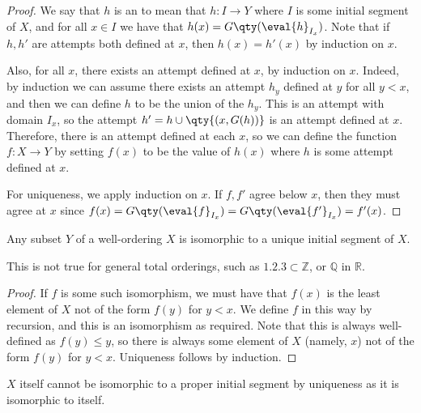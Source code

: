 \begin{proof}
    We say that $h$ is an  to mean that $h \colon I \to Y$ where $I$ is some initial segment of $X$, and for all $x \in I$ we have that $h(x) = G\qty(\eval{h}_{I_x})$.
    Note that if $h, h'$ are attempts both defined at $x$, then $h(x) = h'(x)$ by induction on $x$.

    Also, for all $x$, there exists an attempt defined at $x$, by induction on $x$.
    Indeed, by induction we can assume there exists an attempt $h_y$ defined at $y$ for all $y < x$, and then we can define $h$ to be the union of the $h_y$.
    This is an attempt with domain $I_x$, so the attempt $h' = h \cup \qty{(x, G(h))}$ is an attempt defined at $x$.
    Therefore, there is an attempt defined at each $x$, so we can define the function $f \colon X \to Y$ by setting $f(x)$ to be the value of $h(x)$ where $h$ is some attempt defined at $x$.

    For uniqueness, we apply induction on $x$.
    If $f, f'$ agree below $x$, then they must agree at $x$ since $f(x) = G\qty(\eval{f}_{I_x}) = G\qty(\eval{f'}_{I_x}) = f'(x)$.
\end{proof}
\begin{proposition}
    Any subset $Y$ of a well-ordering $X$ is isomorphic to a unique initial segment of $X$.
\end{proposition}
This is not true for general total orderings, such as $\qty{1, 2, 3} \subset \mathbb Z$, or $\mathbb Q$ in $\mathbb R$.
\begin{proof}
    If $f$ is some such isomorphism, we must have that $f(x)$ is the least element of $X$ not of the form $f(y)$ for $y < x$.
    We define $f$ in this way by recursion, and this is an isomorphism as required.
    Note that this is always well-defined as $f(y) \leq y$, so there is always some element of $X$ (namely, $x$) not of the form $f(y)$ for $y < x$.
    Uniqueness follows by induction.
\end{proof}
\begin{remark}
    $X$ itself cannot be isomorphic to a proper initial segment by uniqueness as it is isomorphic to itself.
\end{remark}

